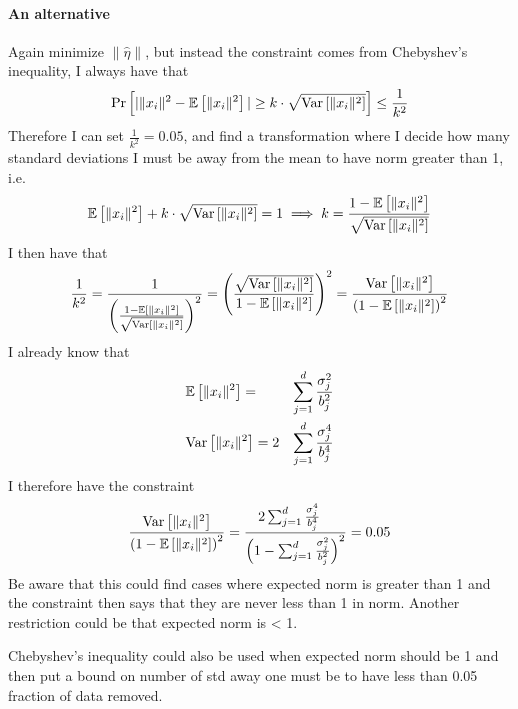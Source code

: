 \documentclass[a4paper,12pt]{article}
\begin{document}
\paragraph*{An alternative}
Again minimize $\| \hat{\eta} \|$, but instead the constraint
comes from Chebyshev's inequality, I always have that
\[
    \Pr\left [ |\|x_i\|^2 - \mathbb{E} \left [ \| x_i \|^2 \right]| \ge k \cdot \sqrt{\text{Var} \left [ \|x_i\|^2  \right]} \right] \le \frac{1}{k^2}
\]
Therefore I can set $\frac{1}{k^2} = 0.05$, and find a 
transformation where I decide how many standard deviations
I must be away from the mean to have norm greater than 1, i.e.
\begin{align*}
    \mathbb{E} \left [ \| x_i \|^2 \right] + k \cdot \sqrt{\text{Var} \left [ \|x_i\|^2  \right]} = 1 \implies k = \frac{1-\mathbb{E} \left [ \| x_i \|^2 \right]}{\sqrt{\text{Var} \left [ \|x_i\|^2  \right]}}
\end{align*}
I then have that
\[
    \frac{1}{k^2} = \frac{1}{\left (\frac{1-\mathbb{E} \left [ \| x_i \|^2 \right]}{\sqrt{\text{Var} \left [ \|x_i\|^2  \right]}}\right)^2} = 
    \left (\frac{\sqrt{\text{Var} \left [ \|x_i\|^2  \right]}}{1-\mathbb{E} \left [ \| x_i \|^2 \right]}\right)^2 = 
    \frac{\text{Var} \left [ \|x_i \|^2  \right]}{\left (1 - \mathbb{E} \left [ \| x_i \|^2 \right]\right)^2}
\]
I already know that
\begin{alignat*}{2}
    &\mathbb{E} \left [ \| x_i \|^2 \right] = &\sum_{j=1}^d \frac{\sigma_j^2}{b_j^2} \\
    &\text{Var} \left [ \|x_i \|^2  \right] = 2 &\sum_{j=1}^d \frac{\sigma_j^4}{b_j^4}
\end{alignat*}
I therefore have the constraint 
\[
    \frac{\text{Var} \left [ \|x_i \|^2  \right]}{\left (1 - \mathbb{E} \left [ \| x_i \|^2 \right]\right)^2} = 
    \frac{2 \sum_{j=1}^d \frac{\sigma_j^4}{b_j^4} \\}
    {\left (1-\sum_{j=1}^d \frac{\sigma_j^2}{b_j^2} \right)^2} = 
    0.05
\]
Be aware that this could find cases where expected norm is greater than 1
and the constraint then says that they are never less than 1 in norm.
Another restriction could be that expected norm is < 1.

Chebyshev's inequality could also be used when expected norm should be 1
and then put a bound on number of std away one must be to have less than 
0.05 fraction of data removed.

\newpage


\newpage



{}

\end{document}
